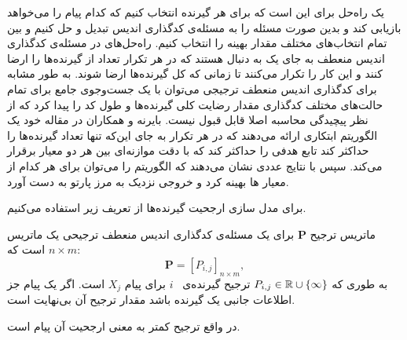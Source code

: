  یک راه‌حل 
 برای 
 \picod
  این است که برای هر گیرنده انتخاب کنیم که کدام پیام را می‌خواهد بازیابی کند و بدین صورت مسئله را به مسئله‌ی کدگذاری اندیس تبدیل و حل کنیم و بین تمام انتخاب‌های مختلف مقدار بهینه را انتخاب کنیم.  راه‌حل‌های
 در مسئله‌ی کدگذاری اندیس منعطف به جای یک 
به دنبال 
هستند که در هر تکرار تعداد
از گیرنده‌ها را ارضا کنند و این کار را تکرار می‌کنند تا زمانی که کل گیرنده‌ها ارضا شوند. به طور مشابه برای کدگذاری اندیس منعطف ترجیجی می‌توان با یک جست‌وجوی جامع برای تمام حالت‌های مختلف کدگذاری مقدار رضایت کلی گیرنده‌ها و طول کد را پیدا کرد که از نظر پیچیدگی محاسبه اصلا قابل قبول نیست. بایرنه و همکاران در مقاله خود یک الگوریتم ابتکاری ارائه می‌دهند که در هر تکرار به جای این‌که تنها تعداد گیرنده‌ها را حداکثر کند تابع هدفی را حداکثر کند که با دقت موازنه‌ای بین هر دو معیار برقرار می‌کند. سپس با نتایج عددی نشان می‌دهند که الگوریتم را می‌توان برای هر کدام از معیار ها بهینه کرد و خروجی نزدیک به مرز پارتو به دست آورد.

برای مدل سازی ارجحیت گیرنده‌ها از تعریف زیر استفاده می‌کنیم.
\begin{definition}
	ماتریس ترجیح
	$\boldsymbol{P}$ 
	برای یک مسئله‌ی کدگذاری اندیس منعطف ترجیحی یک ماتریس
	 $n\times m$
	 است که:
	\begin{equation}
		\boldsymbol{P} = [P_{i,j}]_{n\times m},
	\end{equation}
	به طوری که
	 $P_{i,j}\in\mathbb{R}\cup\left\{ \infty \right\}$
	 ترجیح گیرنده‌ی
	 ~$i$
	 برای پیام
	  $X_j$
	  است.
	اگر یک پیام جز اطلاعات جانبی یک گیرنده باشد مقدار ترجیح آن بی‌نهایت است.
	
	در واقع ترجیح کمتر به معنی ارجحیت آن پیام است.
\end{definition}

